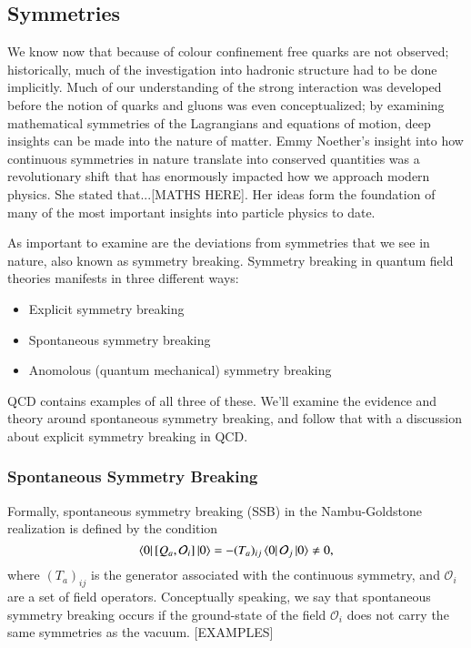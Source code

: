 \documentclass[aps,prd,onecolumn,showpacs,amsmath,amssymb,nofootinbib]{revtex4} \pdfoutput=1
\begin{document}
\subsection{Symmetries}
We know now that because of colour confinement free quarks are not observed; historically, much of the investigation into hadronic structure had to be done implicitly. Much of our understanding of the strong interaction was developed before the notion of quarks and gluons was even conceptualized; by examining mathematical symmetries of the Lagrangians and equations of motion, deep insights can be made into the nature of matter. Emmy Noether's insight into how continuous symmetries in nature translate into conserved quantities was a revolutionary shift that has enormously impacted how we approach modern physics. She stated that...[MATHS HERE]. Her ideas form the foundation of many of the most important insights into particle physics to date.

As important to examine are the deviations from symmetries that we see in nature, also known as symmetry breaking. Symmetry breaking in quantum field theories manifests in three different ways:
\begin{itemize}
    \item Explicit symmetry breaking
    \item Spontaneous symmetry breaking
    \item Anomolous (quantum mechanical) symmetry breaking
\end{itemize}
QCD contains examples of all three of these. We'll examine the evidence and theory around spontaneous symmetry breaking, and follow that with a discussion about explicit symmetry breaking in QCD.

\subsubsection{Spontaneous Symmetry Breaking}
Formally, spontaneous symmetry breaking (SSB) in the Nambu-Goldstone realization is defined by the condition
\begin{equation}\label{eq:ssb}
    \bra{0} \left[ Q_{a},\mathcal{O}_{i}\right]\ket{0} = -(T_{a})_{ij}\bra{0}\mathcal{O}_{j}\ket{0}\neq 0,
\end{equation}
where $(T_{a})_{ij}$ is the generator associated with the continuous symmetry, and $\mathcal{O}_i$ are a set of field operators. Conceptually speaking, we say that spontaneous symmetry breaking occurs if the ground-state of the field $\mathcal{O}_{i}$ does not carry the same symmetries as the vacuum.
[EXAMPLES]
\end{document}
